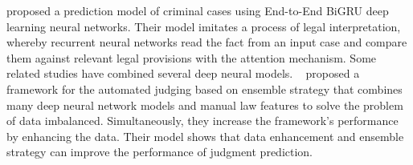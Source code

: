 \documentclass[sn-mathphys,Numbered]{sn-jnl}%
\theoremstyle{thmstyleone}%
\theoremstyle{thmstyletwo}%
\theoremstyle{thmstylethree}%
\begin{document}
\citet{kowsrihawat2018predicting} proposed a prediction model of criminal cases using End-to-End BiGRU deep learning neural networks. Their model imitates a process of legal interpretation, whereby recurrent neural networks read the fact from an input case and compare them against relevant legal provisions with the attention mechanism. %
Some related studies have combined several deep neural models. ~\citet{yuan2019automatic} proposed a framework for the automated judging based on ensemble strategy that combines many  deep neural network models and manual law features to solve the problem of data imbalanced. Simultaneously, they increase the framework's performance by enhancing the data. Their model shows that data enhancement and ensemble strategy can improve the performance of judgment prediction.
\end{document}

